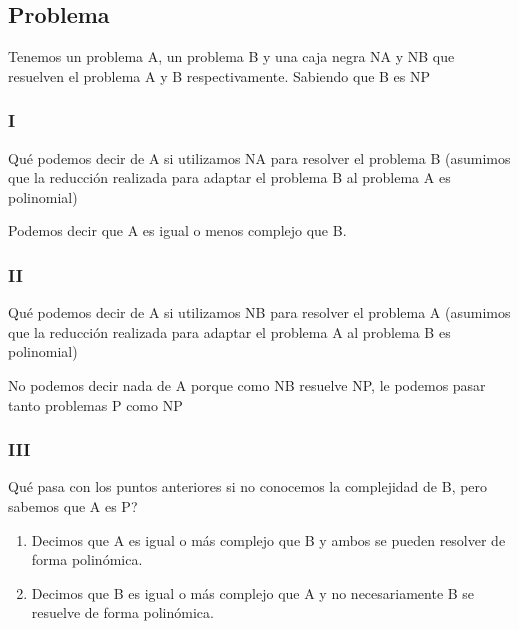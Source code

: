 
\subsection{Problema}
Tenemos un problema A, un problema B y una caja negra NA y NB que resuelven el problema A y B respectivamente. Sabiendo que B es NP
\subsubsection{I}
Qué podemos decir de A si utilizamos NA para resolver el problema B (asumimos que la reducción realizada para adaptar el problema B al problema A es polinomial)

Podemos decir que A es igual o menos complejo que B.
\subsubsection{II}
Qué podemos decir de A si utilizamos NB para resolver el problema A (asumimos que la reducción realizada para adaptar el problema A al problema B es polinomial)\newline

No podemos decir nada de A porque como NB resuelve NP, le podemos pasar tanto problemas P como NP

\subsubsection{III}
Qué pasa con los puntos anteriores si no conocemos la complejidad de B, pero sabemos que A es P?

\begin{enumerate}
    \item Decimos que A es igual o más complejo que B y ambos se pueden resolver de forma polinómica.
    \item Decimos que B es igual o más complejo que A y no necesariamente B se resuelve de forma polinómica.
\end{enumerate}

